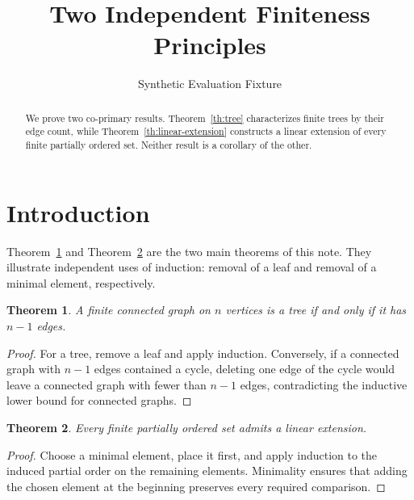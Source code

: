 \documentclass{article}
\title{Two Independent Finiteness Principles}
\author{Synthetic Evaluation Fixture}
\newtheorem{theorem}{Theorem}
\begin{document}
\maketitle

\begin{abstract}
We prove two co-primary results. Theorem~\ref{th:tree} characterizes finite trees by their edge count, while Theorem~\ref{th:linear-extension} constructs a linear extension of every finite partially ordered set. Neither result is a corollary of the other.
\end{abstract}

\section{Introduction}

Theorem~\ref{th:tree} and Theorem~\ref{th:linear-extension} are the two main theorems of this note. They illustrate independent uses of induction: removal of a leaf and removal of a minimal element, respectively.

\begin{theorem}\label{th:tree}
A finite connected graph on $n$ vertices is a tree if and only if it has $n-1$ edges.
\end{theorem}

\begin{proof}
For a tree, remove a leaf and apply induction. Conversely, if a connected graph with $n-1$ edges contained a cycle, deleting one edge of the cycle would leave a connected graph with fewer than $n-1$ edges, contradicting the inductive lower bound for connected graphs.
\end{proof}

\begin{theorem}\label{th:linear-extension}
Every finite partially ordered set admits a linear extension.
\end{theorem}

\begin{proof}
Choose a minimal element, place it first, and apply induction to the induced partial order on the remaining elements. Minimality ensures that adding the chosen element at the beginning preserves every required comparison.
\end{proof}
\end{document}
